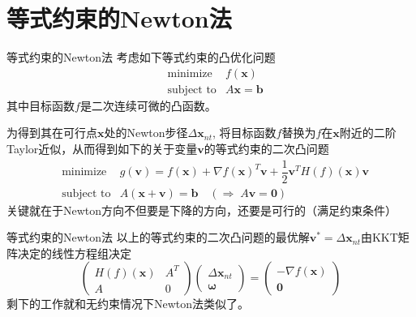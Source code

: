 
\section{等式约束的Newton法}


\begin{frame}

\begin{block}{等式约束的Newton法}
考虑如下等式约束的凸优化问题
\vspace{-0.5em}
\begin{eqnarray*}
& \text{minimize} & f(\mathbf{x}) \\
& \text{subject to} & A\mathbf{x} = \mathbf{b}
\end{eqnarray*}
其中目标函数$f$是二次连续可微的凸函数。

\pause
\vspace{1em}

为得到其在可行点$\mathbf{x}$处的Newton步径$\Delta \mathbf{x}_{nt}$, 将目标函数$f$替换为$f$在$\mathbf{x}$附近的二阶Taylor近似，从而得到如下的关于变量$\mathbf{v}$的等式约束的二次凸问题
\vspace{-0.5em}
\begin{eqnarray*}
& \text{minimize} & g(\mathbf{v}) = f(\mathbf{x}) + \nabla f(\mathbf{x})^T \mathbf{v} + \dfrac{1}{2} \mathbf{v}^T H(f)(\mathbf{x}) \mathbf{v} \\
& \text{subject to} & A(\mathbf{x} + \mathbf{v}) = \mathbf{b} \quad (\Longrightarrow \; A\mathbf{v} = \mathbf{0})
\end{eqnarray*}
关键就在于Newton方向不但要是下降的方向，还要是可行的（满足约束条件）
\end{block}

\end{frame}


\begin{frame}

\begin{block}{等式约束的Newton法}
以上的等式约束的二次凸问题的最优解$\mathbf{v}^* = \Delta \mathbf{x}_{nt}$由KKT矩阵决定的线性方程组决定
\[
\begin{pmatrix} H(f)(\mathbf{x}) & A^T \\ A & 0 \end{pmatrix} \begin{pmatrix} \Delta \mathbf{x}_{nt} \\ \boldsymbol\omega \end{pmatrix} = \begin{pmatrix} -\nabla f(\mathbf{x}) \\ \mathbf{0} \end{pmatrix}
\]
剩下的工作就和无约束情况下Newton法类似了。
\end{block}

\end{frame}

